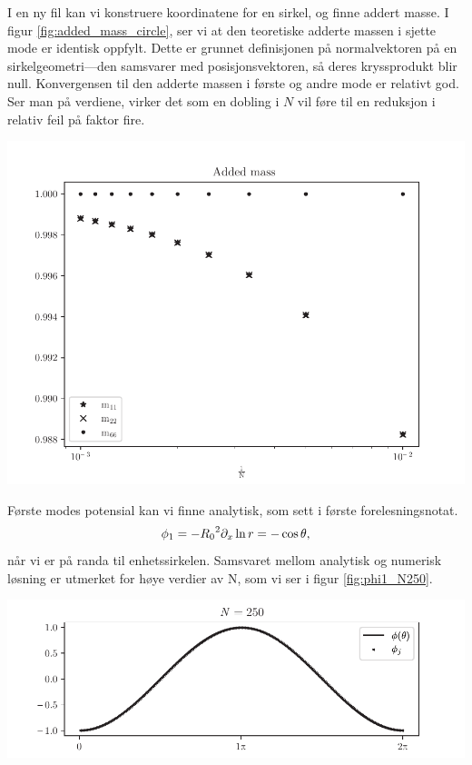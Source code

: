 I en ny fil kan vi konstruere koordinatene for en sirkel, og finne addert masse.
I figur \ref{fig:added_mass_circle}, ser vi at den teoretiske adderte massen i sjette mode er identisk oppfylt.
Dette er grunnet definisjonen på normalvektoren på en sirkelgeometri---den samsvarer med posisjonsvektoren, så deres kryssprodukt blir null.
Konvergensen til den adderte massen i første og andre mode er relativt god.
Ser man på verdiene, virker det som en dobling i $N$ vil føre til en reduksjon i relativ feil på faktor fire.
\begin{Figure}
    \centering
    \captionsetup{type = figure}
    \includegraphics[width = \linewidth]{SECTIONS/CIRCLE/addedmass_circle_N1000.pdf}
    \label{fig:added_mass_circle}
\end{Figure}
\noindent Første modes potensial kan vi finne analytisk, som sett i første forelesningsnotat.
\[
    \phi_1 = - {R_0}^2 \partial_x \ln{r} = -\cos{\theta},
\]
når vi er på randa til enhetssirkelen.
Samsvaret mellom analytisk og numerisk løsning er utmerket for høye verdier av N, som vi ser i figur \ref{fig:phi1_N250}.
\begin{Figure}
    \centering
    \captionsetup{type = figure}
    \includegraphics[width = \linewidth]{phi1_N250.pdf}
    \label{fig:phi1_N250}
\end{Figure}

